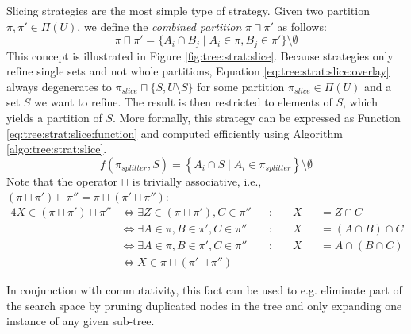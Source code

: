 			Slicing strategies are the most simple type of strategy.
			Given two partition $\pi, \pi' \in \Pi(U)$, we define the \textit{combined partition} $\pi \sqcap \pi'$ as follows:
			\begin{equation}
				\label{eq:tree:strat:slice:overlay}
				\pi \sqcap \pi' = \{ A_i \cap B_j \mid A_i \in \pi, B_j \in \pi' \} \setminus \emptyset
			\end{equation}
			This concept is illustrated in Figure \ref{fig:tree:strat:slice}.
			Because strategies only refine single sets and not whole partitions, Equation \ref{eq:tree:strat:slice:overlay} always degenerates to $\pi_{slice} \sqcap \{ S, U \setminus S \}$ for some partition $\pi_{slice} \in \Pi(U)$ and a set $S$ we want to refine.
			The result is then restricted to elements of $S$, which yields a partition of $S$.
			More formally, this strategy can be expressed as Function \ref{eq:tree:strat:slice:function} and computed efficiently using Algorithm \ref{algo:tree:strat:slice}.
			\begin{equation}
			\label{eq:tree:strat:slice:function}
				f(\pi_{splitter}, S) = \left\{ A_i \cap S \mid A_i \in \pi_{splitter} \right\} \setminus \emptyset
			\end{equation}
			Note that the operator $\sqcap$ is trivially associative, i.e., $(\pi \sqcap \pi') \sqcap \pi'' = \pi \sqcap (\pi' \sqcap \pi'')$:
			\begin{alignat*}{4}
				X \in (\pi \sqcap \pi') \sqcap \pi'' &\iff \exists Z \in (\pi \sqcap \pi'), C \in \pi'' && : \; && X && ={} Z \cap C \\
				&\iff \exists A \in \pi, B \in \pi', C \in \pi''&& : \; && X && ={} (A \cap B) \cap C \\
				&\iff \exists A \in \pi, B \in \pi', C \in \pi''&& : \; && X && ={} A \cap (B \cap C) \\
				&\iff  X \in \pi \sqcap (\pi' \sqcap \pi'')
			\end{alignat*}
			
			In conjunction with commutativity, this fact can be used to e.g. eliminate part of the search space by pruning duplicated nodes in the tree and only expanding one instance of any given sub-tree.
		
